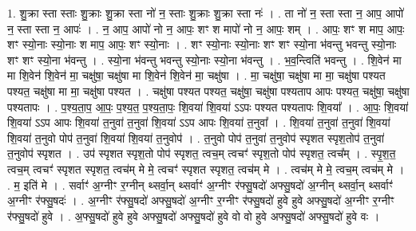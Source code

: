 \documentclass[17pt]{extarticle}
\begin{document}
1. शु॒क्रा स्ता स्ताः शु॒क्राः शु॒क्रा स्ता नो॑ न॒ स्ताः शु॒क्राः शु॒क्रा स्ता नः॑ । . ता नो॑ न॒ स्ता स्ता न॒ आप॒ आपो॑ न॒ स्ता स्ता न॒ आपः॑ । . न॒ आप॒ आपो॑ नो न॒ आपः॒ शꣳ श मापो॑ नो न॒ आपः॒ शम् । . आपः॒ शꣳ श माप॒ आपः॒ शꣳ स्यो॒नाः स्यो॒नाः श माप॒ आपः॒ शꣳ स्यो॒नाः । . शꣳ स्यो॒नाः स्यो॒नाः शꣳ शꣳ स्यो॒ना भ॑वन्तु भवन्तु स्यो॒नाः शꣳ शꣳ स्यो॒ना भ॑वन्तु । . स्यो॒ना भ॑वन्तु भवन्तु स्यो॒नाः स्यो॒ना भ॑वन्तु । . भ॒व॒न्त्विति॑ भवन्तु । . शि॒वेन॑ मा मा शि॒वेन॑ शि॒वेन॑ मा॒ चक्षु॑षा॒ चक्षु॑षा मा शि॒वेन॑ शि॒वेन॑ मा॒ चक्षु॑षा । . मा॒ चक्षु॑षा॒ चक्षु॑षा मा मा॒ चक्षु॑षा पश्यत पश्यत॒ चक्षु॑षा मा मा॒ चक्षु॑षा पश्यत । . चक्षु॑षा पश्यत पश्यत॒ चक्षु॑षा॒ चक्षु॑षा पश्यताप आपः पश्यत॒ चक्षु॑षा॒ चक्षु॑षा पश्यतापः । . प॒श्य॒ता॒प॒ आ॒पः॒ प॒श्य॒त॒ प॒श्य॒ता॒पः॒ शि॒वया॑ शि॒वया॑ ऽऽपः पश्यत पश्यतापः शि॒वया᳚ । . आ॒पः॒ शि॒वया॑ शि॒वया॑ ऽऽप आपः शि॒वया॑ त॒नुवा॑ त॒नुवा॑ शि॒वया॑ ऽऽप आपः शि॒वया॑ त॒नुवा᳚ । . शि॒वया॑ त॒नुवा॑ त॒नुवा॑ शि॒वया॑ शि॒वया॑ त॒नुवो पोप॑ त॒नुवा॑ शि॒वया॑ शि॒वया॑ त॒नुवोप॑ । . त॒नुवो पोप॑ त॒नुवा॑ त॒नुवोप॑ स्पृशत स्पृश॒तोप॑ त॒नुवा॑ त॒नुवोप॑ स्पृशत । . उप॑ स्पृशत स्पृश॒तो पोप॑ स्पृशत॒ त्वच॒म् त्वचꣳ॑ स्पृश॒तो पोप॑ स्पृशत॒ त्वच᳚म् । . स्पृ॒श॒त॒ त्वच॒म् त्वचꣳ॑ स्पृशत स्पृशत॒ त्वच॑म् मे मे॒ त्वचꣳ॑ स्पृशत स्पृशत॒ त्वच॑म् मे । . त्वच॑म् मे मे॒ त्वच॒म् त्वच॑म् मे । . म॒ इति॑ मे । . सर्वाꣳ॑ अ॒ग्नीꣳ र॒ग्नीन् थ्सर्वा॒न् थ्सर्वाꣳ॑ अ॒ग्नीꣳ र॑फ्सु॒षदो॑ अफ्सु॒षदो॑ अ॒ग्नीन् थ्सर्वा॒न् थ्सर्वाꣳ॑ अ॒ग्नीꣳ र॑फ्सु॒षदः॑ । . अ॒ग्नीꣳ र॑फ्सु॒षदो॑ अफ्सु॒षदो॑ अ॒ग्नीꣳ र॒ग्नीꣳ र॑फ्सु॒षदो॑ हुवे हुवे अफ्सु॒षदो॑ अ॒ग्नीꣳ र॒ग्नीꣳ र॑फ्सु॒षदो॑ हुवे । . अ॒फ्सु॒षदो॑ हुवे हुवे अफ्सु॒षदो॑ अफ्सु॒षदो॑ हुवे वो वो हुवे अफ्सु॒षदो॑ अफ्सु॒षदो॑ हुवे वः । \newline
\end{document}
